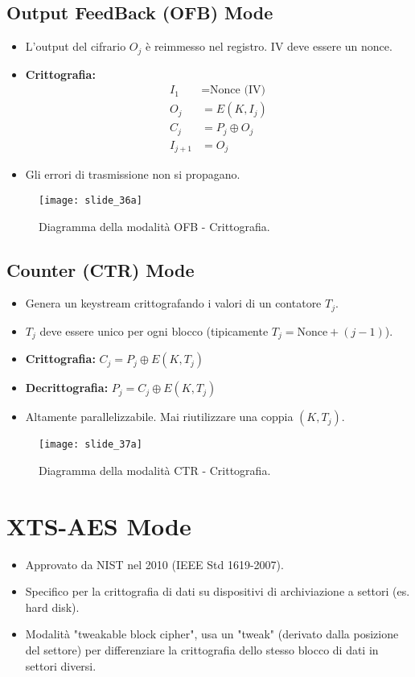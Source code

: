 \documentclass{article}
\begin{document}
\subsection{Output FeedBack (OFB) Mode}
\begin{itemize}
    \item L'output del cifrario $O_j$ è reimmesso nel registro. IV deve essere un nonce.
    \item \textbf{Crittografia:}
    \begin{align*}
        I_1 &= \text{Nonce (IV)} \\
        O_j &= E(K, I_j) \\
        C_j &= P_j \oplus O_j \\
        I_{j+1} &= O_j
    \end{align*}
    \item Gli errori di trasmissione non si propagano.
\end{itemize}
\begin{figure}[H]
    \centering
    \texttt{[image: slide\_36a]} %
    \caption{Diagramma della modalità OFB - Crittografia.}
    \label{fig:ofb_encryption}
\end{figure}

\subsection{Counter (CTR) Mode}
\begin{itemize}
    \item Genera un keystream crittografando i valori di un contatore $T_j$.
    \item $T_j$ deve essere unico per ogni blocco (tipicamente $T_j = \text{Nonce} + (j-1)$).
    \item \textbf{Crittografia:} $C_j = P_j \oplus E(K, T_j)$
    \item \textbf{Decrittografia:} $P_j = C_j \oplus E(K, T_j)$
    \item Altamente parallelizzabile. Mai riutilizzare una coppia $(K, T_j)$.
\end{itemize}
\begin{figure}[H]
    \centering
    \texttt{[image: slide\_37a]} %
    \caption{Diagramma della modalità CTR - Crittografia.}
    \label{fig:ctr_encryption}
\end{figure}

\section{XTS-AES Mode}
\begin{itemize}
    \item Approvato da NIST nel 2010 (IEEE Std 1619-2007).
    \item Specifico per la crittografia di dati su dispositivi di archiviazione a settori (es. hard disk).
    \item Modalità "tweakable block cipher", usa un "tweak" (derivato dalla posizione del settore) per differenziare la crittografia dello stesso blocco di dati in settori diversi.
\end{itemize}
\end{document}

